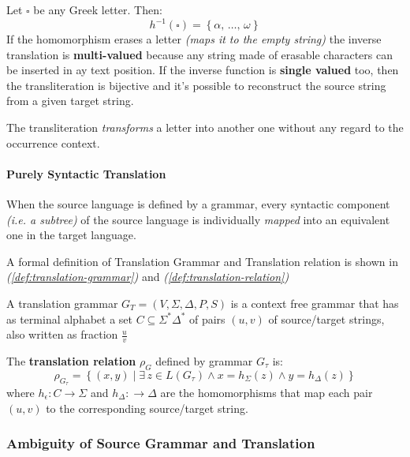 \documentclass[english]{article}
\begin{document}
Let \(\square\) be any Greek letter.
Then:
\[ h^{-1}\left( \square \right) = \left\{ \alpha, \, \ldots, \, \omega \right\} \]
If the homomorphism erases a letter \textit{(maps it to the empty string)} the inverse translation is \textbf{multi-valued} because any string made of erasable characters can be inserted in ay text position.
If the inverse function is \textbf{single valued} too, then the transliteration is bijective and it's possible to reconstruct the source string from a given target string.

\bigskip
The transliteration \textit{transforms} a letter into another one without any regard to the occurrence context.

\paragraph{Purely Syntactic Translation}

When the source language is defined by a grammar, every syntactic component \textit{(i.e. a subtree)} of the source language is individually \textit{mapped} into an equivalent one in the target language.

A formal definition of Translation Grammar and Translation relation is shown in \textit{(\ref{def:translation-grammar})} and \textit{(\ref{def:translation-relation})}

\begin{definition}
  \label{def:translation-grammar}
  A translation grammar \(G_T = \left( V, \Sigma, \Delta, P, S \right)\) is a context free grammar that has as terminal alphabet a set \(C \subseteq \Sigma^\ast \Delta^\ast\) of pairs \(\left( u, v \right)\) of source/target strings, also written as fraction \(\frac{u}{v}\)
\end{definition}

\begin{definition}
  \label{def:translation-relation}
  The \textbf{translation relation} \(\rho_G\) defined by grammar \(G_\tau\) is:
  \[ \rho_{G_\tau}  = \left\{ \left( x, y \right) \mid \exists \, z \in L\left( G_\tau \right) \land x = h_\Sigma \left( z \right) \land y = h_\Delta \left( z \right) \right\} \]
  where \(h_\epsilon : C \rightarrow \Sigma\) and \(h_\Delta : \rightarrow \Delta\) are the homomorphisms that map each pair \(\left( u, v \right)\) to the corresponding source/target string.
\end{definition}

\subsubsection{Ambiguity of Source Grammar and Translation}
\end{document}
